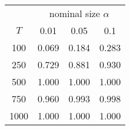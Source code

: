 % 
\begin{tabular}{cccc}
  \hline
  & \multicolumn{3}{c}{nominal size $\alpha$} \\
 $T$ & 0.01 & 0.05 & 0.1 \\
 \hline
100 & 0.069 & 0.184 & 0.283 \\ 
  250 & 0.729 & 0.881 & 0.930 \\ 
  500 & 1.000 & 1.000 & 1.000 \\ 
  750 & 0.960 & 0.993 & 0.998 \\ 
  1000 & 1.000 & 1.000 & 1.000 \\ 
   \hline
\end{tabular}
